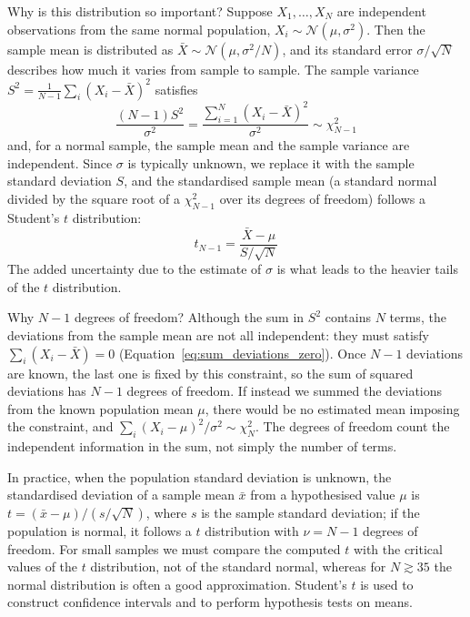 \documentclass[letterpaper,11pt,leqno]{book}
\begin{document}
Why is this distribution so important? Suppose $X_1, \dots, X_N$ are independent observations from the same normal population, $X_i \sim \mathcal{N}(\mu, \sigma^2)$. Then the sample mean is distributed as $\bar{X} \sim \mathcal{N}(\mu, \sigma^2/N)$, and its standard error $\sigma/\sqrt{N}$ describes how much it varies from sample to sample. The sample variance $S^2 = \frac{1}{N - 1}\sum_i(X_i - \bar{X})^2$ satisfies
\begin{equation}
\boxed{\frac{(N - 1)S^2}{\sigma^2} = \frac{\sum_{i=1}^{N}(X_i - \bar{X})^2}{\sigma^2} \sim \chi_{N-1}^2}
\label{eq:sample_variance_chi2}
\end{equation}
and, for a normal sample, the sample mean and the sample variance are independent. Since $\sigma$ is typically unknown, we replace it with the sample standard deviation $S$, and the standardised sample mean (a standard normal divided by the square root of a $\chi^2_{N-1}$ over its degrees of freedom) follows a Student's $t$ distribution:
\begin{equation}
\boxed{t_{N-1} = \frac{\bar{X} - \mu}{S/\sqrt{N}}}
\label{eq:t_statistic_mean}
\end{equation}
The added uncertainty due to the estimate of $\sigma$ is what leads to the heavier tails of the $t$ distribution.

Why $N - 1$ degrees of freedom? Although the sum in $S^2$ contains $N$ terms, the deviations from the sample mean are not all independent: they must satisfy $\sum_i(X_i - \bar{X}) = 0$ (Equation~\eqref{eq:sum_deviations_zero}). Once $N - 1$ deviations are known, the last one is fixed by this constraint, so the sum of squared deviations has $N - 1$ degrees of freedom. If instead we summed the deviations from the known population mean $\mu$, there would be no estimated mean imposing the constraint, and $\sum_i(X_i - \mu)^2/\sigma^2 \sim \chi_N^2$. The degrees of freedom count the independent information in the sum, not simply the number of terms.

In practice, when the population standard deviation is unknown, the standardised deviation of a sample mean $\bar{x}$ from a hypothesised value $\mu$ is $t = (\bar{x} - \mu)/(s/\sqrt{N})$, where $s$ is the sample standard deviation; if the population is normal, it follows a $t$ distribution with $\nu = N - 1$ degrees of freedom. For small samples we must compare the computed $t$ with the critical values of the $t$ distribution, not of the standard normal, whereas for $N \gtrsim 35$ the normal distribution is often a good approximation. Student's $t$ is used to construct confidence intervals and to perform hypothesis tests on means.
\end{document}
